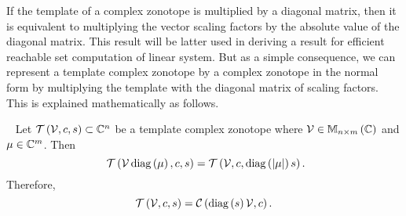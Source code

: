 If the template of a complex zonotope is multiplied by a diagonal
matrix, then it is equivalent to multiplying the vector scaling
factors by the absolute value of the diagonal matrix.  This result
will be latter used in deriving a result for efficient reachable set
computation of linear system.  But as a simple consequence, we can
represent a template complex zonotope by a complex zonotope in the
normal form by multiplying the template with the diagonal matrix of
scaling factors.  This is explained mathematically as follows.
%
\begin{lemma}[Normalization]~\label{lem:normalization}
Let $\mathit{\mathcal{T}}\left(\mathcal{V},c,s\right)\subset\mathbb{C}^n$ be a template
complex zonotope where $\mathcal{V}\in\mathbb{M}_{n\times m}\left(\mathbb{C}\right)$ and
$\mu\in\mathbb{C}^m$.  Then
%
\begin{equation}~\label{eqn:normalization}
\mathit{\mathcal{T}}\left(\mathcal{V}\operatorname{diag}\left(\mu\right),c,s\right)=\mathit{\mathcal{T}}\left(\mathcal{V},c,\operatorname{diag}\left(\left|\mu\right|\right)s\right).
\end{equation}
%
Therefore,
%
\[
\mathit{\mathcal{T}}\left(\mathcal{V},c,s\right)=\mathit{\mathcal{C}}\left(\operatorname{diag}\left(s\right)\mathcal{V},c\right).
\]
%
\end{lemma}
%
